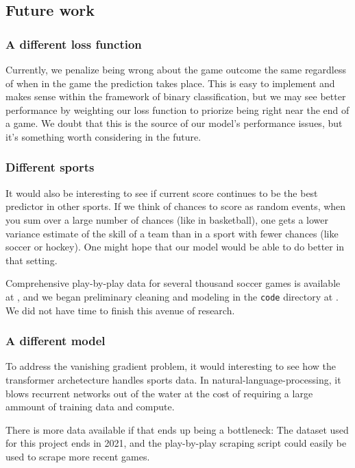 \subsection{Future work}

\subsubsection{A different loss function}

Currently, we penalize being wrong about the game outcome the same regardless of when in the game the prediction takes place. This is easy to implement and makes sense within the framework of binary classification, but we may see better performance by weighting our loss function to priorize being right near the end of a game. We doubt that this is the source of our model's performance issues, but it's something worth considering in the future.

\subsubsection{Different sports}

It would also be interesting to see if current score continues to be the best predictor in other sports. If we think of chances to score as random events, when you sum over a large number of chances (like in basketball), one gets a lower variance estimate of the skill of a team than in a sport with fewer chances (like soccer or hockey). One might hope that our model would be able to do better in that setting.

Comprehensive play-by-play data for several thousand soccer games is available at \cite{statsbomb-open-data}, and we began preliminary cleaning and modeling in the \texttt{code} directory at \cite{stat-comps-github}. We did not have time to finish this avenue of research.

\subsubsection{A different model}

To address the vanishing gradient problem, it would interesting to see how the transformer archetecture handles sports data. In natural-language-processing, it blows recurrent networks out of the water at the cost of requiring a large ammount of training data and compute.

There is more data available if that ends up being a bottleneck: The dataset used for this project ends in 2021, and the play-by-play scraping script \cite{pbp-scraper-github} could easily be used to scrape more recent games.

